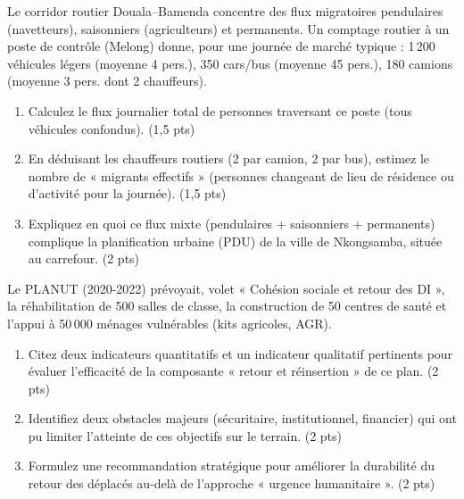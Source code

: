 \documentclass[11pt]{article}
\begin{document}
\begin{exercice}
\label{exo:corridor}
Le corridor routier Douala--Bamenda concentre des flux migratoires pendulaires (navetteurs), saisonniers (agriculteurs) et permanents. Un comptage routier à un poste de contrôle (Melong) donne, pour une journée de marché typique : 1\,200 véhicules légers (moyenne 4 pers.), 350 cars/bus (moyenne 45 pers.), 180 camions (moyenne 3 pers. dont 2 chauffeurs).

\begin{enumerate}
    \item Calculez le flux journalier total de personnes traversant ce poste (tous véhicules confondus). (1,5 pts)
    \item En déduisant les chauffeurs routiers (2 par camion, 2 par bus), estimez le nombre de « migrants effectifs » (personnes changeant de lieu de résidence ou d'activité pour la journée). (1,5 pts)
    \item Expliquez en quoi ce flux mixte (pendulaires + saisonniers + permanents) complique la planification urbaine (PDU) de la ville de Nkongsamba, située au carrefour. (2 pts)
\end{enumerate}
\end{exercice}

\begin{exercice}
\label{exo:planut}
Le PLANUT (2020-2022) prévoyait, volet « Cohésion sociale et retour des DI », la réhabilitation de 500 salles de classe, la construction de 50 centres de santé et l'appui à 50\,000 ménages vulnérables (kits agricoles, AGR).

\begin{enumerate}
    \item Citez deux indicateurs quantitatifs et un indicateur qualitatif pertinents pour évaluer l'efficacité de la composante « retour et réinsertion » de ce plan. (2 pts)
    \item Identifiez deux obstacles majeurs (sécuritaire, institutionnel, financier) qui ont pu limiter l'atteinte de ces objectifs sur le terrain. (2 pts)
    \item Formulez une recommandation stratégique pour améliorer la durabilité du retour des déplacés au-delà de l'approche « urgence humanitaire ». (2 pts)
\end{enumerate}
\end{exercice}
\end{document}
